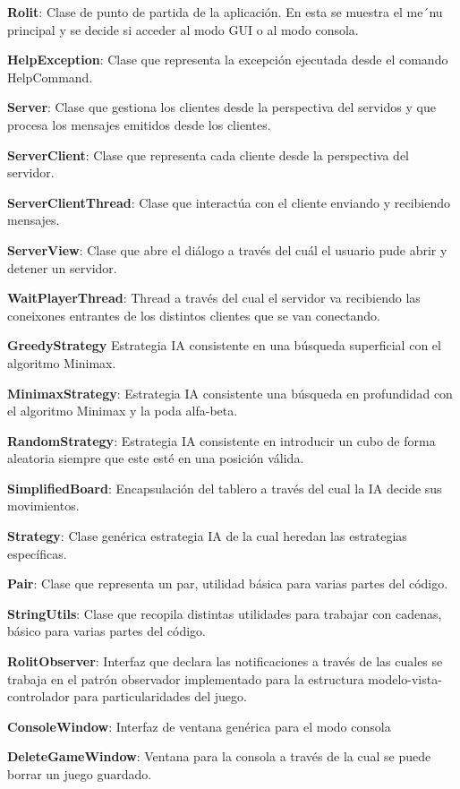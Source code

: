 \documentclass[12pt,a4paper,openright]{book}
\theoremstyle{break}
\begin{document}
\textbf{Rolit}: Clase de punto de partida de la aplicación. En esta se muestra el me´nu principal y se decide si acceder al modo GUI o al modo consola.

\textbf{HelpException}: Clase que representa la excepción ejecutada desde el comando HelpCommand.

\textbf{Server}: Clase que gestiona los clientes desde la perspectiva del servidos y que procesa los mensajes emitidos desde los clientes.

\textbf{ServerClient}: Clase que representa cada cliente desde la perspectiva del servidor.

\textbf{ServerClientThread}: Clase que interactúa con el cliente enviando y recibiendo mensajes.

\textbf{ServerView}: Clase que abre el diálogo a través del cuál el usuario pude abrir y detener un servidor.

\textbf{WaitPlayerThread}: Thread a través del cual el servidor va recibiendo las coneixones entrantes de los distintos clientes que se van conectando.

\textbf{GreedyStrategy} Estrategia IA consistente en una búsqueda superficial con el algoritmo Minimax.

\textbf{MinimaxStrategy}: Estrategia IA consistente una búsqueda en profundidad con el algoritmo Minimax y la poda alfa-beta.

\textbf{RandomStrategy}: Estrategia IA consistente en introducir un cubo de forma aleatoria siempre que este esté en una posición válida.


\textbf{SimplifiedBoard}: Encapsulación del tablero a través del cual la IA decide sus movimientos.

\textbf{Strategy}: Clase genérica estrategia IA de la cual heredan las estrategias específicas.

\textbf{Pair}: Clase que representa un par, utilidad básica para varias partes del código.

\textbf{StringUtils}: Clase que recopila distintas utilidades para trabajar con cadenas, básico para varias partes del código.

\textbf{RolitObserver}: Interfaz que declara las notificaciones a través de las cuales se trabaja en el patrón observador implementado para la estructura modelo-vista-controlador para particularidades del juego.

\textbf{ConsoleWindow}: Interfaz de ventana genérica para el modo consola

\textbf{DeleteGameWindow}: Ventana para la consola a través de la cual se puede borrar un juego guardado.
\end{document}
